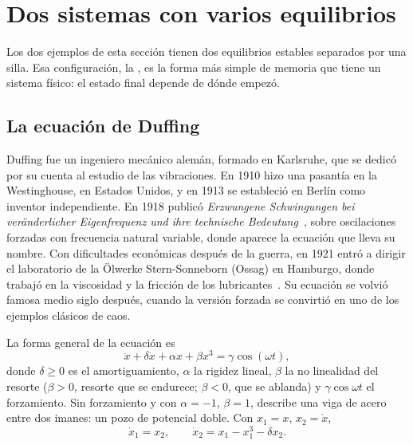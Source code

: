 \section{Dos sistemas con varios equilibrios}
\label{sec:bi-ejemplos}

Los dos ejemplos de esta sección tienen dos equilibrios estables separados por una silla. Esa configuración, la , es la forma más simple de memoria que tiene un sistema físico: el estado final depende de dónde empezó.

\subsection{La ecuación de Duffing}

\begin{historia}
Duffing fue un ingeniero mecánico alemán, formado en Karlsruhe, que se dedicó por su cuenta al estudio de las vibraciones. En 1910 hizo una pasantía en la Westinghouse, en Estados Unidos, y en 1913 se estableció en Berlín como inventor independiente. En 1918 publicó \emph{Erzwungene Schwingungen bei veränderlicher Eigenfrequenz und ihre technische Bedeutung}~\citep{Duf18}, sobre oscilaciones forzadas con frecuencia natural variable, donde aparece la ecuación que lleva su nombre. Con dificultades económicas después de la guerra, en 1921 entró a dirigir el laboratorio de la Ölwerke Stern-Sonneborn (Ossag) en Hamburgo, donde trabajó en la viscosidad y la fricción de los lubricantes~\citep{KoBr11}. Su ecuación se volvió famosa medio siglo después, cuando la versión forzada se convirtió en uno de los ejemplos clásicos de caos.
\end{historia}

La forma general de la ecuación es
\[
  \ddot x+\delta\dot x+\alpha x+\beta x^3=\gamma\cos(\omega t),
\]
donde $\delta\ge0$ es el amortiguamiento, $\alpha$ la rigidez lineal, $\beta$ la no linealidad del resorte ($\beta>0$, resorte que se endurece; $\beta<0$, que se ablanda) y $\gamma\cos\omega t$ el forzamiento. Sin forzamiento y con $\alpha=-1$, $\beta=1$, describe una viga de acero entre dos imanes: un pozo de potencial doble. Con $x_1=x$, $x_2=\dot x$,
\begin{equation}
  \dot x_1=x_2,\qquad \dot x_2=x_1-x_1^3-\delta x_2 .
  \label{eq:bi-duffing}
\end{equation}

